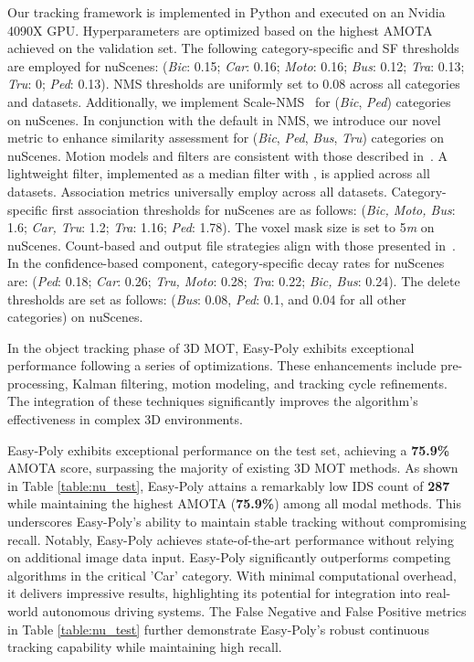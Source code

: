 Our tracking framework is implemented in Python and executed on an Nvidia 4090X GPU. Hyperparameters are optimized based on the highest AMOTA achieved on the validation set. The following category-specific and SF thresholds are employed for nuScenes: (\textit{Bic}: 0.15; \textit{Car}: 0.16; \textit{Moto}: 0.16; \textit{Bus}: 0.12; \textit{Tra}: 0.13; \textit{Tru}: 0; \textit{Ped}: 0.13). NMS thresholds are uniformly set to 0.08 across all categories and datasets. Additionally, we implement Scale-NMS~\cite{huang2021bevdet} for (\textit{Bic}, \textit{Ped}) categories on nuScenes.
In conjunction with the default in NMS, we introduce our novel  metric to enhance similarity assessment for (\textit{Bic}, \textit{Ped}, \textit{Bus}, \textit{Tru}) categories on nuScenes. Motion models and filters are consistent with those described in~\cite{li2023poly}. A lightweight filter, implemented as a median filter with , is applied across all datasets. Association metrics universally employ  across all datasets.
Category-specific first association thresholds  for nuScenes are as follows: (\textit{Bic, Moto, Bus}: 1.6; \textit{Car, Tru}: 1.2; \textit{Tra}: 1.16; \textit{Ped}: 1.78). The voxel mask size  is set to 5\textit{m} on nuScenes. Count-based and output file strategies align with those presented in~\cite{li2023poly}.
In the confidence-based component, category-specific decay rates for nuScenes are: (\textit{Ped}: 0.18; \textit{Car}: 0.26; \textit{Tru, Moto}: 0.28; \textit{Tra}: 0.22; \textit{Bic, Bus}: 0.24). The delete thresholds  are set as follows: (\textit{Bus}: 0.08, \textit{Ped}: 0.1, and 0.04 for all other categories) on nuScenes.

In the object tracking phase of 3D MOT, Easy-Poly exhibits exceptional performance following a series of optimizations. These enhancements include pre-processing, Kalman filtering, motion modeling, and tracking cycle refinements. The integration of these techniques significantly improves the algorithm's effectiveness in complex 3D environments.

Easy-Poly exhibits exceptional performance on the test set, achieving a \textbf{75.9\%} AMOTA score, surpassing the majority of existing 3D MOT methods. As shown in Table \ref{table:nu_test}, Easy-Poly attains a remarkably low IDS count of \textbf{287} while maintaining the highest AMOTA (\textbf{75.9\%}) among all modal methods. This underscores Easy-Poly's ability to maintain stable tracking without compromising recall. Notably, Easy-Poly achieves state-of-the-art performance without relying on additional image data input. Easy-Poly significantly outperforms competing algorithms in the critical 'Car' category. With minimal computational overhead, it delivers impressive results, highlighting its potential for integration into real-world autonomous driving systems. The False Negative and False Positive metrics in Table \ref{table:nu_test} further demonstrate Easy-Poly's robust continuous tracking capability while maintaining high recall.

